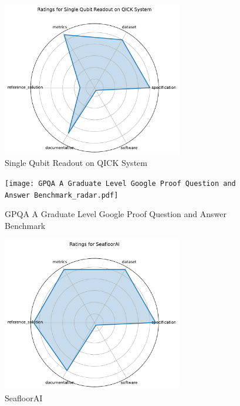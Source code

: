 \documentclass{article}
\begin{document}
\begin{figure}[h!]
  \centering
  \includegraphics[width=0.7\textwidth]{Single Qubit Readout on QICK System_radar.pdf}
  \caption{Single Qubit Readout on QICK System}
\end{figure}

\begin{figure}[h!]
  \centering
  \texttt{[image: GPQA A Graduate Level Google Proof Question and Answer Benchmark\_radar.pdf]}
  \caption{GPQA A Graduate Level Google Proof Question and Answer Benchmark}
\end{figure}

\begin{figure}[h!]
  \centering
  \includegraphics[width=0.7\textwidth]{SeafloorAI_radar.pdf}
  \caption{SeafloorAI}
\end{figure}
\end{document}
